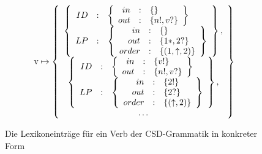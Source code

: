    
\begin{figure}
$$
\text{v} \mapsto
\left \{
\begin{array}{c}
\left \{
\begin{array}{r c l}
ID & : & \left \{ 
\begin{array}{r c l}
in & : &\{\}\\
out & : & \{n!, v? \} \\
\end{array}
\right \} \\
LP & : & \left \{ 
\begin{array}{r c l}
in & : &\{\}\\
out & : & \{1*, 2? \} \\
order & : & \{(1, \uparrow , 2)\}
\end{array}
\right \} \\
\end{array}
\right \} , \\
\left \{
\begin{array}{r c l}
ID & : & \left \{ 
\begin{array}{r c l}
in & : &\{v!\}\\
out & : & \{n!, v? \} \\
\end{array}
\right \} \\
LP & : & \left \{ 
\begin{array}{r c l}
in & : &\{2!\}\\
out & : & \{2? \} \\
order & : & \{( \uparrow , 2)\}
\end{array}
\right \} \\
\end{array} 
\right \} , \\
\ldots
\end{array}
 \right \}
$$
\caption{Die Lexikoneintr\"age f\"ur ein Verb der CSD-Grammatik in
konkreter Form}
\label{csdlexiconexample}
\end{figure}

